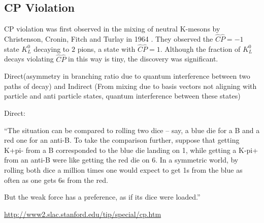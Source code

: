 \subsection{CP Violation}

CP violation was first observed in the mixing of neutral K-mesons by Christenson, Cronin, Fitch and Turlay in 1964 \cite{FirstCPV}. They observed the $\hat{C}\hat{P} = -1$ state $K^{0}_L$ decaying to $2$ pions, a state with $\hat{C}\hat{P} = 1$. Although the fraction of $K^{0}_L$ decays violating $\hat{C}\hat{P}$ in this way is tiny, the discovery was significant.     

Direct(asymmetry in branching ratio due to quantum interference between two paths of decay) and Indirect (From mixing due to basis vectors not aligning with particle and anti particle states, quantum interference between these states)

Direct:

``The situation can be compared to rolling two dice – say, a blue die for a B and a red one for an anti-B.  To take the comparison further, suppose that getting K+pi- from a B corresponded to the blue die landing on 1, while getting a K-pi+ from an anti-B were like getting the red die on 6. In a symmetric world, by rolling both dice a million times one would expect to get 1s from the blue as often as one gets 6s from the red.

But the weak force has a preference, as if its dice were loaded.''

\url{http://www2.slac.stanford.edu/tip/special/cp.htm}


